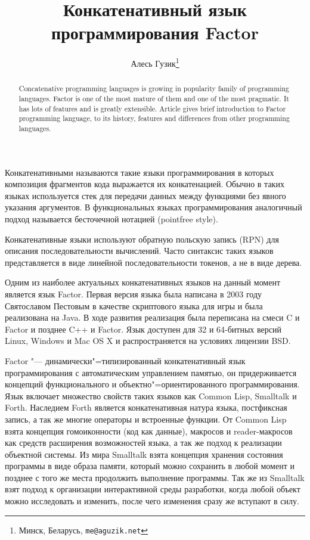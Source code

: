 \documentclass[a5paper,10pt]{article}
\begin{document}
\title{Конкатенативный язык программирования Factor}

\author{Алесь Гузик\footnote{Минск, Беларусь, {\tt me@aguzik.net}}}
\date{}
\maketitle


\begin{abstract}
  Concatenative programming languages is growing in popularity family
  of programming languages. Factor is one of the most mature of them
  and one of the most pragmatic. It has lots of features and is
  greatly extensible. Article gives brief introduction to Factor
  programming language, to its history, features and differences from
  other programming languages.
\end{abstract}

Конкатенативными называются такие языки программирования в которых
композиция фрагментов кода выражается их конкатенацией. Обычно в
таких языках используется стек для передачи данных между функциями без
явного указания аргументов. В функциональных языках программирования
аналогичный подход называется бесточечной нотацией (pointfree style).

Конкатенативные языки используют обратную польскую запись (RPN) для
описания последовательности вычислений. Часто синтаксис таких языков
представляется в виде линейной последовательности токенов, а не в виде
дерева.

Одним из наиболее актуальных конкатенативных языков на данный момент
является язык Factor. Первая версия языка была написана в 2003 году
Святославом Пестовым в качестве скриптового языка для игры и была
реализована на Java. В ходе развития реализация была переписана на
смеси C и Factor и позднее C++ и Factor. Язык доступен для 32 и
64-битных версий Linux, Windows и Mac OS X и распространяется на
условиях лицензии BSD.

Factor "--- динамически"=типизированный конкатенативный язык
программирования с автоматическим управлением памятью, он придерживается
концепций функционального и объектно"=ориентированного
программирования. Язык включает  множество свойств таких языков
как Common Lisp, Smalltalk и Forth. Наследием Forth является
конкатенативная натура языка, постфиксная запись, а так же многие
операторы и встроенные функции. От Common Lisp взята концепция
гомоиконности (код как данные), макросов и reader-макросов как средств
расширения возможностей языка, а так же подход к реализации объектной
системы. Из мира Smalltalk взята концепция хранения состояния
программы в виде образа памяти, который можно сохранить в любой момент
и позднее с того же места продолжить выполнение программы. Так же из
Smalltalk взят подход к организации интерактивной среды разработки,
когда любой объект можно исследовать и изменить, после чего изменения
сразу же вступают в силу.
\end{document}
